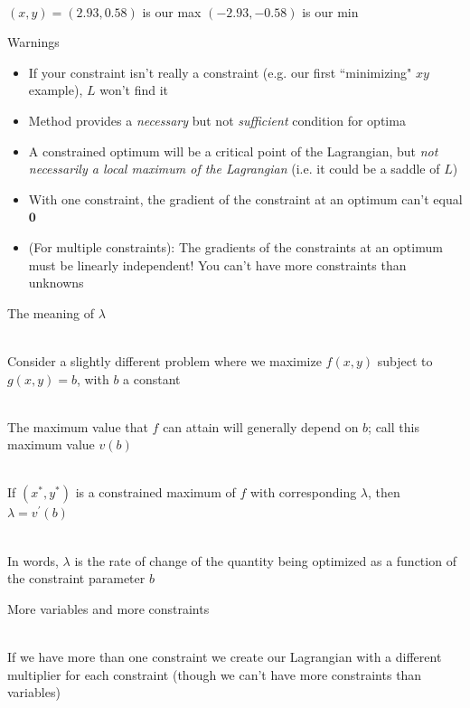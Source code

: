 \documentclass[10pt]{seminar}
\begin{document}
\begin{slide}
\ \\ $(x, y)=(2.93, 0.58)$ is our max $(-2.93, -0.58)$ is our min 

\begin{center}
\end{center}

\newslide
Warnings

\begin{itemize}
\item If your constraint isn't really a constraint (e.g. our first ``minimizing" $xy$ example), $L$ won't find it
\item Method provides a \textit{necessary} but not \textit{sufficient} condition for optima
\item A constrained optimum will be a critical point of the Lagrangian, but \textit{not necessarily a local maximum of the Lagrangian} (i.e. it could be a saddle of $L$)
\item With one constraint, the gradient of the constraint at an optimum can't equal $\mathbf{0}$ 
\item (For multiple constraints): The gradients of the constraints at an optimum must be linearly independent! You can't have more constraints than unknowns
\end{itemize}

\newslide
The meaning of $\lambda$

\ \\Consider a slightly different problem where we maximize $f(x, y)$ subject to $g(x, y)=b$, with $b$ a constant

\ \\The maximum value that $f$ can attain will generally depend on $b$; call this maximum value $v(b)$

\ \\If $(x^*, y^*)$ is a constrained maximum of $f$  with corresponding $\lambda$, then $\lambda=v^\prime(b)$

\ \\In words, $\lambda$ is the rate of change of the quantity being optimized as a function of the constraint parameter $b$


\newslide
More variables and more constraints

\ \\If we have more than one constraint we create our Lagrangian with a different multiplier for each constraint (though we can't have more constraints than variables)


\end{slide}
\end{document}
